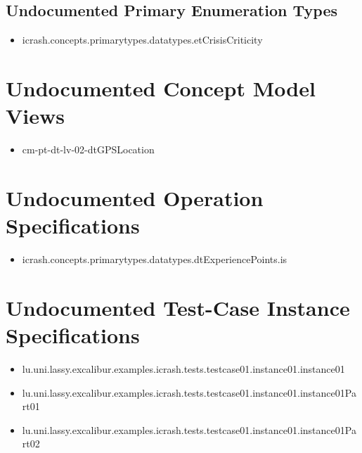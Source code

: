 \subsection[Undocumented Primary Enumeration Types]{Undocumented Primary Enumeration Types}
\begin{itemize}
\item icrash.concepts.primarytypes.datatypes.etCrisisCriticity 
\end{itemize}













\section[Undocumented Concept Model Views]{Undocumented Concept Model Views}
\begin{itemize}
\item cm-pt-dt-lv-02-dtGPSLocation 
\end{itemize}


\section[Undocumented Operation Specifications]{Undocumented Operation Specifications}
\begin{itemize}
\item icrash.concepts.primarytypes.datatypes.dtExperiencePoints.is 
\end{itemize}





\section[Undocumented Test-Case Instance Specifications]{Undocumented Test-Case Instance Specifications}
\begin{itemize}
\item lu.uni.lassy.excalibur.examples.icrash.tests.testcase01.instance01.instance01 
\item lu.uni.lassy.excalibur.examples.icrash.tests.testcase01.instance01.instance01Part01 
\item lu.uni.lassy.excalibur.examples.icrash.tests.testcase01.instance01.instance01Part02 
\end{itemize}




